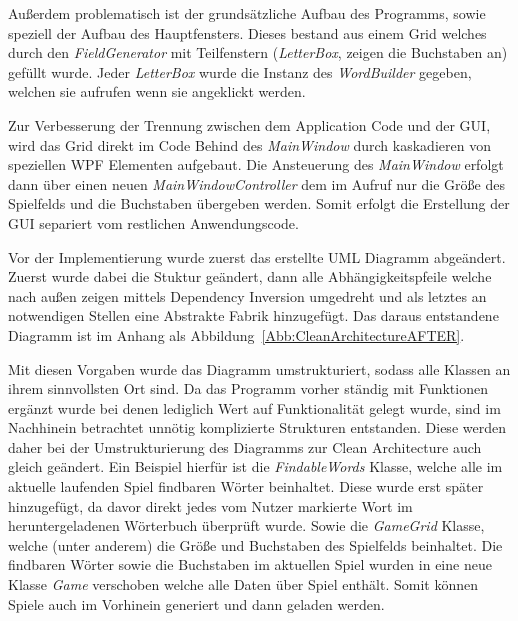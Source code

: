 Außerdem problematisch ist der grundsätzliche Aufbau des Programms, sowie speziell der Aufbau des Hauptfensters. Dieses bestand aus einem Grid welches durch den \textit{FieldGenerator} mit Teilfenstern (\textit{LetterBox}, zeigen die Buchstaben an) gefüllt wurde. Jeder \textit{LetterBox} wurde die Instanz des \textit{WordBuilder} gegeben, welchen sie aufrufen wenn sie angeklickt werden.


Zur Verbesserung der Trennung zwischen dem Application Code und der GUI, wird das Grid direkt im Code Behind des \textit{MainWindow} durch kaskadieren von speziellen WPF  Elementen aufgebaut. Die Ansteuerung des \textit{MainWindow} erfolgt dann über einen neuen \textit{MainWindowController} dem im Aufruf nur die Größe des Spielfelds und die Buchstaben übergeben werden. Somit erfolgt die Erstellung der GUI separiert vom restlichen Anwendungscode.


Vor der Implementierung wurde zuerst das erstellte UML Diagramm abgeändert. Zuerst wurde dabei die Stuktur geändert, dann alle Abhängigkeitspfeile welche nach außen zeigen mittels Dependency Inversion umgedreht und als letztes an notwendigen Stellen eine Abstrakte Fabrik hinzugefügt. Das daraus entstandene Diagramm ist im Anhang als Abbildung~\ref{Abb:CleanArchitectureAFTER}.


Mit diesen Vorgaben wurde das Diagramm umstrukturiert, sodass alle Klassen an ihrem sinnvollsten Ort sind. Da das Programm vorher ständig mit Funktionen ergänzt wurde bei denen lediglich Wert auf Funktionalität gelegt wurde, sind im Nachhinein betrachtet unnötig komplizierte Strukturen entstanden. Diese werden daher bei der Umstrukturierung des Diagramms zur Clean Architecture auch gleich geändert. 
Ein Beispiel hierfür ist die \textit{FindableWords} Klasse, welche alle im aktuelle laufenden Spiel findbaren Wörter beinhaltet. Diese wurde erst später hinzugefügt, da davor direkt jedes vom Nutzer markierte Wort im heruntergeladenen Wörterbuch überprüft wurde. Sowie die \textit{GameGrid} Klasse, welche (unter anderem) die Größe und Buchstaben des Spielfelds beinhaltet. Die findbaren Wörter sowie die Buchstaben im aktuellen Spiel wurden in eine neue Klasse \textit{Game} verschoben welche alle Daten über Spiel enthält. Somit können Spiele auch im Vorhinein generiert und dann geladen werden.


